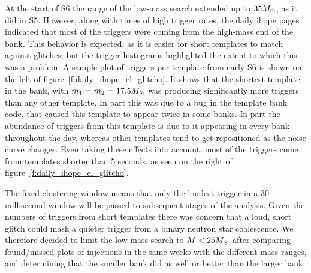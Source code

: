 At the start of S6 the range of the low-mass search extended up to $35
M_\odot$, as it did in S5.  However, along with times of high trigger
rates, the daily ihope pages indicated that most of the triggers were
coming from the high-mass end of the bank.  This behavior is expected,
as it is easier for short templates to match against glitches, but the
trigger histograms highlighted the extent to which this was a problem.
A sample plot of triggers per template from early S6 is shown on the
left of figure~\ref{f:daily_ihope_el_glitcho}.  It shows that the
shortest template in the bank, with $m_1 = m_2 = 17.5 M_\odot$ was
producing significantly more triggers than any other template.  In
part this was due to a bug in the template bank code, that caused this
template to appear twice in some banks.  In part the abundance of
triggers from this template is due to it appearing in every bank
throughout the day, whereas other templates tend to get repositioned
as the noise curve changes.  Even taking these effects into account,
most of the triggers come from templates shorter than 5 seconds, as
seen on the right of figure~\ref{f:daily_ihope_el_glitcho}.

The fixed clustering window means that only the loudest trigger in a
30-millisecond window will be passed to subsequent stages of the
analysis.  Given the numbers of triggers from short templates there
was concern that a loud, short glitch could mask a quieter trigger
from a binary neutron star coalescence.  We therefore decided to limit
the low-mass search to $M < 25 M_\odot$ after comparing found/missed
plots of injections in the same weeks with the different mass ranges,
and determining that the smaller bank did as well or better than the
larger bank.


